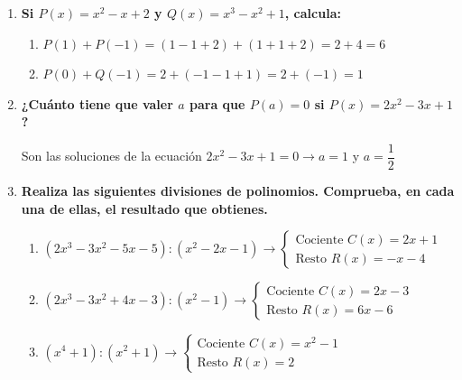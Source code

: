 \documentclass[a4paper,12pt]{article}
\begin{document}
\begin{enumerate}
    \item \textbf{Si $P(x) = x^2 - x + 2$ y $Q(x) = x^3 - x^2 + 1$, calcula:}
    \begin{enumerate}[label=\textbf{\alph*)}]
        \item $P(1) + P(-1) = (1 - 1 + 2) + (1 + 1 + 2) = 2 + 4 = 6$
        \item $P(0) + Q(-1) = 2 + (-1 - 1 + 1) = 2 + (-1) = 1$
    \end{enumerate}

    \vspace{0.5cm}

    \item \textbf{¿Cuánto tiene que valer $a$ para que $P(a) = 0$ si $P(x) = 2x^2 - 3x + 1$?}

    Son las soluciones de la ecuación $2x^2 - 3x + 1 = 0 \longrightarrow a = 1$ y $a = \dfrac{1}{2}$

    \vspace{0.5cm}

    \item \textbf{Realiza las siguientes divisiones de polinomios. Comprueba, en cada una de ellas, el resultado que obtienes.}
        \begin{enumerate}[label=\textbf{\alph*)}]
            \item $(2x^3 - 3x^2 - 5x - 5) : (x^2 - 2x - 1) \longrightarrow \begin{cases} \text{Cociente } C(x) = 2x + 1 \\ \text{Resto } R(x) = -x - 4 \end{cases}$

            \vspace{0.3cm}

            \item $(2x^3 - 3x^2 + 4x - 3) : (x^2 - 1) \longrightarrow \begin{cases} \text{Cociente } C(x) = 2x - 3 \\ \text{Resto } R(x) = 6x - 6 \end{cases}$

            \vspace{0.3cm}

            \item $(x^4 + 1) : (x^2 + 1) \longrightarrow \begin{cases} \text{Cociente } C(x) = x^2 - 1 \\ \text{Resto } R(x) = 2 \end{cases}$


\end{enumerate}
\end{enumerate}
\end{document}
